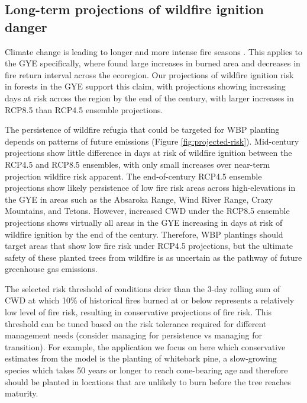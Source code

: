 \documentclass[11p]{article}
\begin{document}
\subsection{Long-term projections of wildfire ignition danger}

Climate change is leading to longer and more intense fire seasons \citep{abatzoglouImpactAnthropogenicClimate2016,abatzoglouProjectedIncreasesWestern2021,littellReviewRelationshipsDrought2016,jollyClimateinducedVariationsGlobal2015}. This applies to the GYE specifically, where \citet{westerlingContinuedWarmingCould2011} found large increases in burned area and decreases in fire return interval across the ecoregion. Our projections of wildfire ignition risk in forests in the GYE support this claim, with projections showing increasing days at risk across the region by the end of the century, with larger increases in RCP8.5 than RCP4.5 ensemble projections.

The persistence of wildfire refugia that could be targeted for WBP planting depends on patterns of future emissions (Figure \ref{fig:projected-risk}). Mid-century projections show little difference in days at risk of wildfire ignition between the RCP4.5 and RCP8.5 ensembles, with only small increases over near-term projection wildfire risk apparent. The end-of-century RCP4.5 ensemble projections show likely persistence of low fire risk areas across high-elevations in the GYE in areas such as the Absaroka Range, Wind River Range, Crazy Mountains, and Tetons. However, increased CWD under the RCP8.5 ensemble projections shows virtually all areas in the GYE increasing in days at risk of wildfire ignition by the end of the century. Therefore, WBP plantings should target areas that show low fire risk under RCP4.5 projections, but the ultimate safety of these planted trees from wildfire is as uncertain as the pathway of future greenhouse gas emissions.

The selected risk threshold of conditions drier than the 3-day rolling sum of CWD at which 10\% of historical fires burned at or below represents a relatively low level of fire risk, resulting in conservative projections of fire risk. This threshold can be tuned based on the risk tolerance required for different management needs (consider managing for persistence vs managing for transition). For example, the application we focus on here which conservative estimates from the model is the planting of whitebark pine, a slow-growing species which takes 50 years or longer to reach cone-bearing age \citep{tombackWhitebarkPineCommunities2001} and therefore should be planted in locations that are unlikely to burn before the tree reaches maturity.
\end{document}
